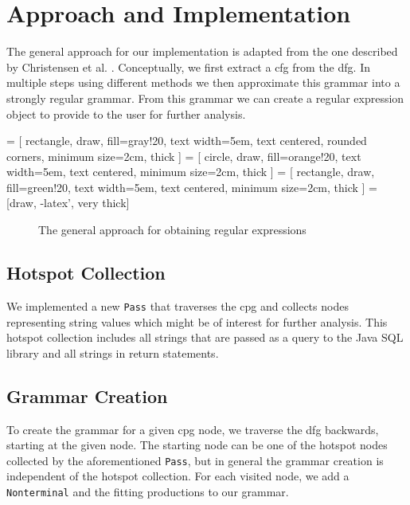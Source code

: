 \chapter{Approach and Implementation}
\label{chapter:Approach}

The general approach for our implementation is adapted from the one described by Christensen et al. \cite{brics}. Conceptually, we first extract a \ac{cfg} from the \ac{dfg}. In multiple steps using different methods we then approximate this grammar into a strongly regular grammar. From this grammar we can create a regular expression object to provide to the user for further analysis.

 = [
	rectangle, 
	draw, 
	fill=gray!20, 
	text width=5em, 
	text centered, 
	rounded corners, 
	minimum size=2cm,
	thick
	]
 = [
	circle, 
	draw, 
	fill=orange!20, 
	text width=5em, 
	text centered,
	minimum size=2cm,
	thick
	]
 = [
	rectangle, 
	draw, 
	fill=green!20, 
	text width=5em, 
	text centered, 
	minimum size=2cm,
	thick
	]
 = [draw, -latex', very thick]
\begin{figure}[H]
	\centering
{}
\caption{The general approach for obtaining regular expressions}
\end{figure}
\label{fig:approach}

\section{Hotspot Collection} 
We implemented a new \lstinline|Pass| that traverses the \ac{cpg} and collects nodes representing string values which might be of interest for further analysis. This hotspot collection includes all strings that are passed as a query to the Java SQL library and all strings in return statements.

\section{Grammar Creation}
To create the grammar for a given \ac{cpg} node, we traverse the \ac{dfg} backwards, starting at the given node. The starting node can be one of the hotspot nodes collected by the aforementioned \lstinline|Pass|, but in general the grammar creation is independent of the hotspot collection.
For each visited node, we add a \lstinline|Nonterminal| and the fitting productions to our grammar. 

